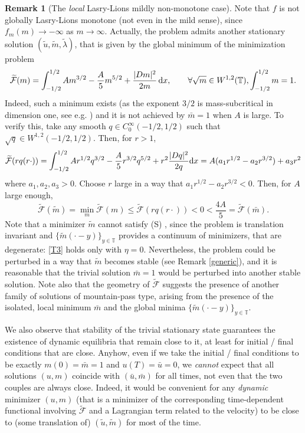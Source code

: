 \documentclass[10pt,a4paper,nouppercase,nowrite]{article}
\numberwithin{equation}{section}
\newcommand{\di}{{\rm d}}
\newcommand{\Sp}{{\textsc (S)} }
\newcommand{\T}{\mathbb{T}}
\theoremstyle{definition}
\newtheorem{rmk}[defn]{Remark}
\begin{document}
\begin{rmk}[The \textit{local} Lasry-Lions mildly non-monotone case]
Note that $f$ is not globally Lasry-Lions monotone (not even in the mild sense), since $f_m(m) \to -\infty$ as $m \to \infty$. Actually, the problem admits another stationary solution $(\tilde u, \tilde m, \tilde \lambda)$, that is given by the global minimum of the minimization problem
\begin{equation*}
	\widetilde{\mathcal{F}}(m)=\int_{-1/2}^{1/2} A m^{3/2} - \frac{A}5 m^{5/2} + \frac{|Dm|^2}{2m} \, \di x, \qquad \forall \sqrt{m} \in W^{1,2}(\T), \int_{-1/2}^{1/2} m =1.
\end{equation*}
Indeed, such a minimum exists (as the exponent $3/2$ is mass-subcritical in dimension one, see e.g. \cite{CCCon}) and it is not achieved by $\bar m = 1$ when $A$ is large. To verify this, take any smooth $q \in C^\infty_0(-1/2,1/2)$ such that $\sqrt{q} \in W^{1,2}(-1/2,1/2)$. Then, for $r > 1$,
\[
\widetilde{\mathcal{F}}(r q(r \cdot))=\int_{-1/2}^{1/2} A r^{1/2 }q^{3/2} - \frac{A}5 r^{3/2} q^{5/2} + r^2 \frac{|Dq|^2}{2q} \di x = A(a_1 r^{1/2} - a_2 r^{3/2}) + a_3 r^2
\]
where $a_1, a_2, a_3 > 0$. Choose $r$ large in a way that $a_1 r^{1/2} - a_2 r^{3/2} < 0$. Then, for $A$ large enough,
\[
\widetilde{\mathcal{F}}(\tilde m) = \min_m \widetilde{\mathcal{F}}(m) \le \widetilde{\mathcal{F}}(r q(r \cdot)) < 0 < \frac{4A}5 = \widetilde{\mathcal{F}}(\bar m).
\]
Note that a minimizer $\tilde m$ cannot satisfy \Sp, since the problem is translation invariant and $\{\tilde m(\cdot-y)\}_{y \in \T}$ provides a continuum of minimizers, that are degenerate: \eqref{T3} holds only with $\eta = 0$. Nevertheless, the problem could be perturbed in a way that $\tilde m$ becomes stable (see Remark \ref{generic}), and it is reasonable that the trivial solution $\bar m = 1$ would be perturbed into another stable solution. Note also that the geometry of $\widetilde{\mathcal{F}}$ suggests the presence of another family of solutions of mountain-pass type, arising from the presence of the isolated, local minimum $\bar m$ and the global minima $\{\tilde m(\cdot-y)\}_{y \in \T}$.

We also observe that stability of the trivial stationary state guarantees the existence of dynamic equilibria that remain close to it, at least for initial / final conditions that are close. Anyhow, even if we take the initial / final conditions to be exactly $m(0) = \bar m = 1$ and $u(T) = \bar u = 0$, we \textit{cannot} expect that all solutions $(u,m)$ coincide with $(\bar u, \bar m)$ for all times, not even that the two couples are always close. Indeed, it would be convenient for any \textit{dynamic} minimizer $(u,m)$ (that is a minimizer of the corresponding time-dependent functional involving $\widetilde{\mathcal{F}}$ and a Lagrangian term related to the velocity) to be close to (some translation of) $(\tilde u, \tilde m)$ for most of the time.


\end{rmk}
\end{document}
